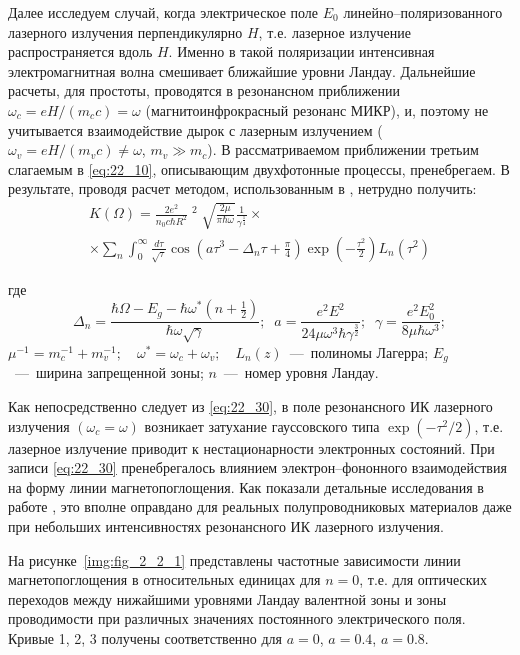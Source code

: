Далее исследуем случай, когда электрическое поле $E_{0} $ линейно--поляризованного лазерного излучения перпендикулярно $H$, т.е. лазерное излучение распространяется вдоль $H$. Именно в такой поляризации интенсивная электромагнитная волна смешивает ближайшие уровни Ландау. Дальнейшие расчеты, для простоты, проводятся в резонансном приближении $\omega _{c} =eH/(m_{c} c)=\omega $ (магнитоинфрокрасный резонанс МИКР), и, поэтому не учитывается взаимодействие дырок с лазерным излучением ($\omega _{v} =eH/(m_{v} c)\ne \omega $, $m_{v} \gg m_{c} $). В рассматриваемом приближении третьим слагаемым в \eqref{eq:22_10}, описывающим двухфотонные процессы, пренебрегаем. В результате, проводя расчет методом, использованным в \cite{Sinyavskii1974,Sinyavskii2002}, нетрудно получить: 
\begin{multline} \label{eq:22_30} 
K(\Omega )=\frac{2e^{2} }{n_{0} c\hbar R^{2} } \mathop{\left|\frac{p_{cv} \xi _{0} }{m_{0} } \right|}\nolimits^{2} \sqrt{\frac{2\mu }{\pi \hbar \omega } } \frac{1}{\gamma ^{{\tfrac{1}{4}} } } \times \\
\times \sum _{n} \int _{0}^{\infty } \frac{d\tau }{\sqrt{\tau } } \cos \left(a\tau ^{3} -\Delta _{n} \tau +\frac{\pi }{4} \right)\exp \left(-\frac{\tau ^{2} }{2} \right)L_{n} (\tau ^{2} )
\end{multline} 

где 
\[
\Delta _{n} =\frac{\hbar \Omega -E_{g} -\hbar \omega ^{*} \left(n+{\tfrac{1}{2}} \right)}{\hbar \omega \sqrt{\gamma } } ;\; \; a=\frac{e^{2} E^{2} }{24\mu \omega ^{3} \hbar \gamma ^{{\tfrac{3}{2}} } } ;\; \; \gamma =\frac{e^{2} E_{0}^{2} }{8\mu \hbar \omega ^{3} } ;
\] 
$\mu ^{-1} =m_{c}^{-1} +m_{v}^{-1} ;$~~$\omega ^{*} =\omega _{c} +\omega _{v} ;$~~$L_{n} (z)$~---~полиномы Лагерра; $E_{g} $~---~ширина запрещенной зоны; $n$~---~номер уровня Ландау. 

\noindent Как непосредственно следует из \eqref{eq:22_30}, в поле резонансного ИК лазерного излучения $(\omega _{c} =\omega )$ возникает затухание гауссовского типа $\exp \left(-\tau ^{2} /2\right)$, т.е. лазерное излучение приводит к нестационарности электронных состояний. При записи \eqref{eq:22_30} пренебрегалось влиянием электрон--фононного взаимодействия на форму линии магнетопоглощения. Как показали детальные исследования в работе \cite{Sinyavskii1976}, это вполне оправдано для реальных полупроводниковых материалов даже при небольших интенсивностях резонансного ИК лазерного излучения. 

На рисунке~\ref{img:fig_2_2_1} представлены частотные зависимости линии магнетопоглощения в относительных единицах для $n=0$, т.е. для оптических переходов между нижайшими уровнями Ландау валентной зоны и зоны проводимости при различных значениях постоянного электрического поля. Кривые 1, 2, 3 получены соответственно для $a=0$, $a=0.4$, $a=0.8$.

